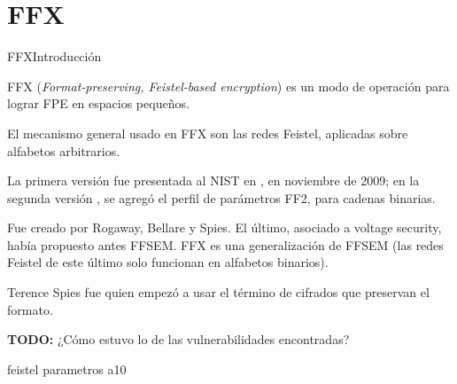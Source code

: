 %
%

\section{FFX}

\begin{frame}{FFX}{Introducción}

  FFX (\textit{Format-preserving, Feistel-based encryption}) es un modo de
  operación para lograr FPE en espacios pequeños.

  El mecanismo general usado en FFX son las redes Feistel, aplicadas sobre
  alfabetos arbitrarios.

  La primera versión fue presentada al NIST en \cite{ffx_1}, en noviembre de
  2009; en la segunda versión \cite{ffx_2}, se agregó el perfil de parámetros
  FF2, para cadenas binarias.

  \note
  {
    Fue creado por Rogaway, Bellare y Spies. El último, asociado a voltage
    security, había propuesto antes FFSEM. FFX es una generalización de
    FFSEM (las redes Feistel de este último solo funcionan en alfabetos
    binarios).

    Terence Spies fue quien empezó a usar el término de cifrados que preservan
    el formato.

    \textbf{TODO:} ¿Cómo estuvo lo de las vulnerabilidades encontradas?
  }

\end{frame}

{feistel}
{parametros}
{a10}
